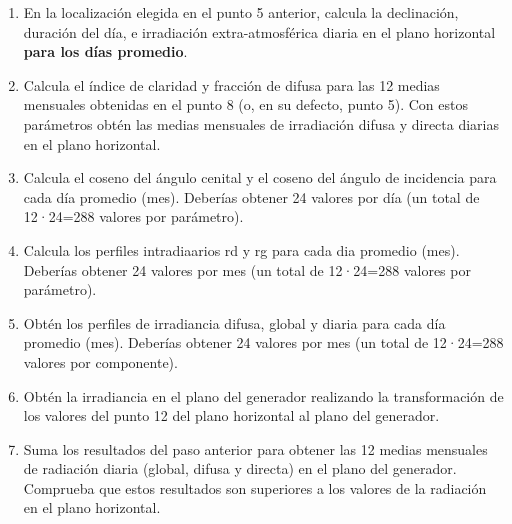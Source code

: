 \documentclass[11pt]{article}
\begin{document}
\begin{enumerate}
\item En la localización elegida en el punto 5 anterior, calcula la declinación, duración del día, e irradiación extra-atmosférica diaria en el plano horizontal \textbf{para los días promedio}.
\item Calcula el índice de claridad y fracción de difusa para las 12 medias mensuales obtenidas en el punto 8 (o, en su defecto, punto 5). Con estos parámetros obtén las medias mensuales de irradiación difusa y directa diarias en el plano horizontal.
\item Calcula el coseno del ángulo cenital y el coseno del ángulo de incidencia para cada día promedio (mes). Deberías obtener 24 valores por día (un total de 12·24=288 valores por parámetro).
\item Calcula los perfiles intradiaarios rd y rg para cada dia promedio (mes). Deberías obtener 24 valores por mes (un total de 12·24=288 valores por parámetro).
\item Obtén los perfiles de irradiancia difusa, global y diaria para cada día promedio (mes). Deberías obtener 24 valores por mes (un total de 12·24=288 valores por componente).
\item Obtén la irradiancia en el plano del generador realizando la transformación de los valores del punto 12 del plano horizontal al plano del generador.
\item Suma los resultados del paso anterior para obtener las 12 medias mensuales de radiación diaria (global, difusa y directa) en el plano del generador. Comprueba que estos resultados son superiores a los valores de la radiación en el plano horizontal.
\end{enumerate}
\end{document}
